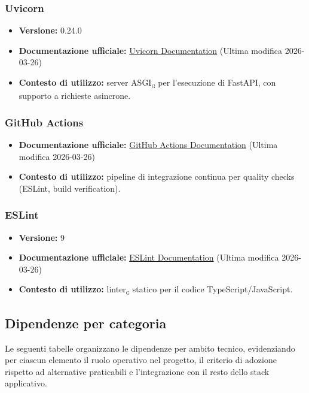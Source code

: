 \documentclass[a4paper, 11pt, oneside]{scrartcl}
\begin{document}
\subsubsection{Uvicorn}
\begin{itemize}[noitemsep]
    \item \textbf{Versione:} 0.24.0
    \item \textbf{Documentazione ufficiale:} \href{https://www.uvicorn.org/}{Uvicorn Documentation} (Ultima modifica 2026-03-26)
    \item \textbf{Contesto di utilizzo:} server ASGI\textsubscript{\textsc{g}} per l'esecuzione di FastAPI, con supporto a richieste asincrone.
\end{itemize}

\subsubsection{GitHub Actions}
\begin{itemize}[noitemsep]
    \item \textbf{Documentazione ufficiale:} \href{https://docs.github.com/actions}{GitHub Actions Documentation} (Ultima modifica 2026-03-26)
    \item \textbf{Contesto di utilizzo:} pipeline di integrazione continua per quality checks (ESLint, build verification).
\end{itemize}

\subsubsection{ESLint}
\begin{itemize}[noitemsep]
    \item \textbf{Versione:} 9
    \item \textbf{Documentazione ufficiale:} \href{https://eslint.org/docs/latest/}{ESLint Documentation} (Ultima modifica 2026-03-26)
    \item \textbf{Contesto di utilizzo:} linter\textsubscript{\textsc{g}} statico per il codice TypeScript/JavaScript.
\end{itemize}
\newpage

\subsection{Dipendenze per categoria}
Le seguenti tabelle organizzano le dipendenze per ambito tecnico, evidenziando per ciascun elemento il ruolo operativo nel progetto, il criterio di adozione rispetto ad alternative praticabili e l'integrazione con il resto dello stack applicativo.
\end{document}
